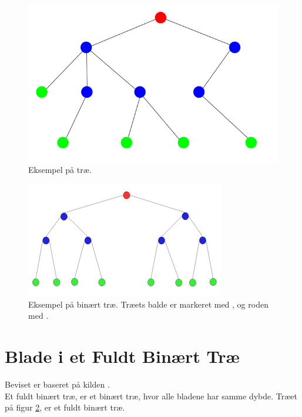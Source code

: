 \begin{figure}
	\begin{center}
		\includegraphics[scale=0.35]{../img/tree.png}
	\end{center}
	\caption{Eksempel på træ.}
	\label{fig:Eksempel på træ.}
\end{figure}



\begin{figure}
	\begin{center}
		\includegraphics[scale=1]{../img/binary_tree.png}
	\end{center}
	\caption{Eksempel på binært træ. Træets balde er markeret med , og roden med . \cite{binaert-trae}}
	\label{fig:Eksempel på binært træ}
\end{figure} 


\section{Blade i et Fuldt Binært Træ}
\label{sec:Blade i et Fuldt Binært Træ}

Beviset er baseret på kilden \cite{tree-leaves}.\\

Et fuldt binært træ, er et binært træ, hvor alle bladene har samme dybde. Træet på figur \ref{fig:Eksempel på binært træ}, er et fuldt binært træ. \\

